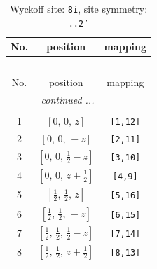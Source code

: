 \documentclass[fleqn,8pt]{jsarticle}
\begin{document}
\begin{longtable}{ccc}
\caption{Wyckoff site: {\tt 8i}, site symmetry: {\tt ..2'}}
 \\
 \hline \hline
No. & position & mapping \\ \hline \endfirsthead

\multicolumn{2}{l}{\tablename\ \thetable{}} \\
 \hline \hline
No. & position & mapping \\ \hline \endhead

 \hline \hline
\multicolumn{2}{r}{\footnotesize\it continued ...} \\ \endfoot

 \hline \hline
\multicolumn{2}{r}{} \\ \endlastfoot

1 & $\left[ 0,\, 0,\, z \right]$ & {\tt [1,12]} \\ \hline
2 & $\left[ 0,\, 0,\, - z \right]$ & {\tt [2,11]} \\ \hline
3 & $\left[ 0,\, 0,\, \frac{1}{2} - z \right]$ & {\tt [3,10]} \\ \hline
4 & $\left[ 0,\, 0,\, z + \frac{1}{2} \right]$ & {\tt [4,9]} \\ \hline
5 & $\left[ \frac{1}{2},\, \frac{1}{2},\, z \right]$ & {\tt [5,16]} \\ \hline
6 & $\left[ \frac{1}{2},\, \frac{1}{2},\, - z \right]$ & {\tt [6,15]} \\ \hline
7 & $\left[ \frac{1}{2},\, \frac{1}{2},\, \frac{1}{2} - z \right]$ & {\tt [7,14]} \\ \hline
8 & $\left[ \frac{1}{2},\, \frac{1}{2},\, z + \frac{1}{2} \right]$ & {\tt [8,13]} \\
\end{longtable}
\renewcommand{\arraystretch}{1.2}
\end{document}
